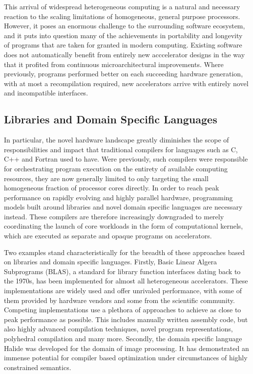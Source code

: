     This arrival of widespread heterogeneous computing is a natural and
    necessary reaction to the scaling limitations of homogeneous, general
    purpose processors.
    However, it poses an enormous challenge to the surrounding software
    ecosystem, and it puts into question many of the achievements in portability
    and longevity of programs that are taken for granted in modern computing.
    Existing software does not automatically benefit from entirely new
    acccelerator designs in the way that it profited from continuous
    microarchitectural improvements.
    Where previously, programs performed better on each succeeding hardware
    generation, with at most a recompilation required, new accelerators arrive
    with entirely novel and incompatible interfaces.

    \subsection*{Libraries and Domain Specific Languages}
    In particular, the novel hardware landscape greatly diminishes the
    scope of responsibilities and impact that traditional compilers for
    languages such as C, C++ and Fortran used to have.
    Were previously, such compilers were responsible for orchestrating
    program execution on the entirety of available computing resources, they are
    now generally limited to only targeting the small homogeneous fraction of
    processor cores directly.
    In order to reach peak performance on rapidly evolving and highly parallel
    hardware, programming models built around libraries and novel domain
    specific languages are necessary instead.
    These compilers are therefore increasingly downgraded to merely coordinating
    the launch of core workloads in the form of computational kernels, which are
    executed as separate and opaque programs on accelerators.

    Two examples stand characteristically for the breadth of these approaches
    based on libraries and domain specific languages.
    Firstly, Basic Linear Algera Subprograms (BLAS), a standard for library
    function interfaces dating back to the 1970s, has been implemented for
    almost all heterogeneous accelerators.
    These implementations are widely used and offer unrivaled performance, with
    some of them provided by hardware vendors and some from the scientific
    community.
    Competing implementations use a plethora of approaches to achieve as close
    to peak performance as possible.
    This includes manually written assembly code, but also highly advanced
    compilation techniques, novel program representations, polyhedral
    compilation and many more.
    Secondly, the domain specific language Halide was developed for the domain
    of image processing.
    It has demonstrated an immense potential for compiler based optimization
    under circumstances of highly constrained semantics.

